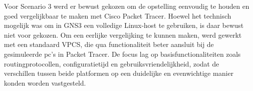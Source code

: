 \vspace{0.3cm}

Voor Scenario 3 werd er bewust gekozen om de opstelling eenvoudig te houden en goed vergelijkbaar te maken met Cisco Packet Tracer. Hoewel het technisch mogelijk was om in GNS3 een volledige Linux-host te gebruiken, is daar bewust niet voor gekozen. Om een eerlijke vergelijking te kunnen maken, werd gewerkt met een standaard VPCS, die qua functionaliteit beter aansluit bij de gesimuleerde pc’s in Packet Tracer. De focus lag op basisfunctionaliteiten zoals routingprotocollen, configuratietijd en gebruiksvriendelijkheid, zodat de verschillen tussen beide platformen op een duidelijke en evenwichtige manier konden worden vastgesteld.

